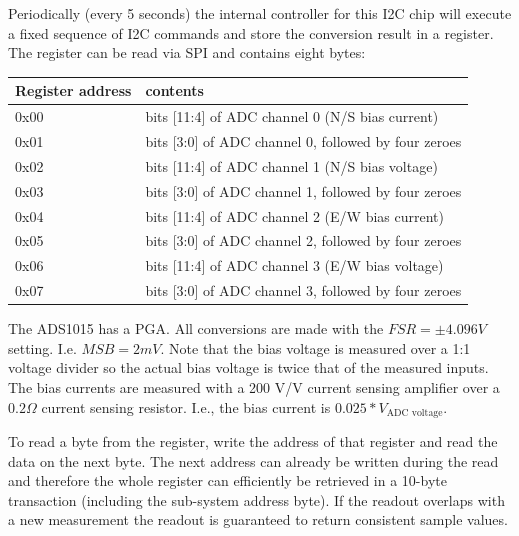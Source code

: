 \documentclass[a4paper,indent]{paper}
\begin{document}
Periodically (every 5 seconds) the internal controller for this \ac{I2C} chip will execute a fixed sequence of \ac{I2C} commands and store the conversion result in a register. The register can be read via \ac{SPI} and contains eight bytes:

\begin{center}
  \begin{tabular}{|l|l|}
    \hline
    Register address & contents \\
    \hline
    0x00 & bits [11:4] of \acs{ADC} channel 0 (N/S bias current)\\
    0x01 & bits [3:0]  of \acs{ADC} channel 0, followed by four zeroes\\
    0x02 & bits [11:4] of \acs{ADC} channel 1 (N/S bias voltage)\\
    0x03 & bits [3:0]  of \acs{ADC} channel 1, followed by four zeroes \\
    0x04 & bits [11:4] of \acs{ADC} channel 2 (E/W bias current)\\
    0x05 & bits [3:0]  of \acs{ADC} channel 2, followed by four zeroes \\
    0x06 & bits [11:4] of \acs{ADC} channel 3 (E/W bias voltage)\\
    0x07 & bits [3:0]  of \acs{ADC} channel 3, followed by four zeroes \\
    \hline
  \end{tabular}
\end{center}

The ADS1015 has a \ac{PGA}. All conversions are made with the $FSR=\pm4.096 V$ setting. I.e. $MSB = 2 mV$.
Note that the bias voltage is measured over a 1:1 voltage divider so the actual bias voltage is twice that of the measured inputs.
The bias currents are measured with a 200 V/V current sensing amplifier over a $0.2\Omega$ current sensing resistor. I.e., the bias current is $0.025 * V_{\text{ADC voltage}}$.

To read a byte from the register, write the address of that register and read the data on the next byte. The next address can already be written during the read and therefore the whole register can efficiently be retrieved in a 10-byte transaction (including the sub-system address byte). 
If the readout overlaps with a new measurement the readout is guaranteed to return consistent sample values.
\end{document}
